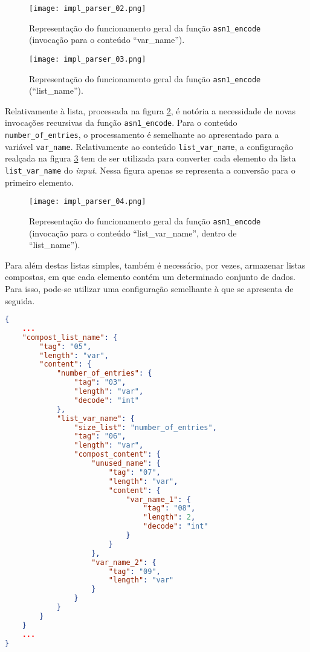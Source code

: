 \begin{figure}[H]
    \centering
    \texttt{[image: impl\_parser\_02.png]}
    \caption{Representação do funcionamento geral da função \texttt{asn1\_encode} (invocação para o conteúdo ``var\_name'').}
    \label{fig:impl_parser_02}
\end{figure}

\begin{figure}[H]
    \centering
    \texttt{[image: impl\_parser\_03.png]}
    \caption{Representação do funcionamento geral da função \texttt{asn1\_encode} (``list\_name'').}
    \label{fig:impl_parser_03}
\end{figure}


Relativamente à lista, processada na figura \ref{fig:impl_parser_03}, é notória a necessidade de novas invocações recursivas da função \texttt{asn1\_encode}. Para o conteúdo \texttt{number\_of\_entries}, o processamento é semelhante ao apresentado para a variável \texttt{var\_name}. Relativamente ao conteúdo \texttt{list\_var\_name}, a configuração realçada na figura \ref{fig:impl_parser_04} tem de ser utilizada para converter cada elemento da lista \texttt{list\_var\_name} do \textit{input}. Nessa figura apenas se representa a conversão para o primeiro elemento.

\begin{figure}[H]
    \centering
    \texttt{[image: impl\_parser\_04.png]}
    \caption{Representação do funcionamento geral da função \texttt{asn1\_encode} (invocação para o conteúdo ``list\_var\_name'', dentro de ``list\_name'').}
    \label{fig:impl_parser_04}
\end{figure}

Para além destas listas simples, também é necessário, por vezes, armazenar listas compostas, em que cada elemento contém um determinado conjunto de dados. Para isso, pode-se utilizar uma configuração semelhante à que se apresenta de seguida.


\begin{lstlisting}[language=json]
{
    ...
    "compost_list_name": {
        "tag": "05",
        "length": "var",
        "content": {
            "number_of_entries": {
                "tag": "03",
                "length": "var",
                "decode": "int"
            },
            "list_var_name": {
                "size_list": "number_of_entries",
                "tag": "06",
                "length": "var", 
                "compost_content": {
                    "unused_name": {
                        "tag": "07",
                        "length": "var",
                        "content": {
                            "var_name_1": {
                                "tag": "08",
                                "length": 2,
                                "decode": "int"
                            }
                        }
                    },
                    "var_name_2": {
                        "tag": "09",
                        "length": "var"
                    }
                }
            }
        }
    }
    ...
}
\end{lstlisting}

